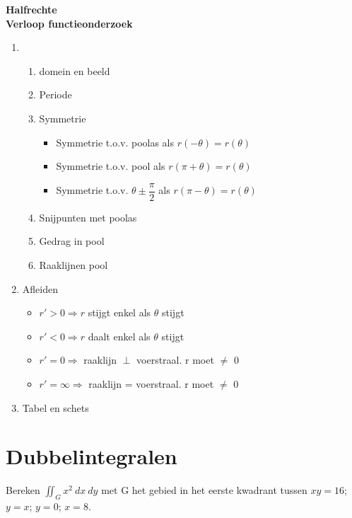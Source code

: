 \documentclass[12pt]{report}
\newcommand{\important}[1] {\textbf{\color{orange}#1}}
\begin{document}
\important{Halfrechte}
\\
\important{Verloop functieonderzoek}
\begin{enumerate}
 \item \begin{enumerate}
        \item domein en beeld
        \item Periode
        \item Symmetrie
        \begin{itemize}
         \item Symmetrie t.o.v. poolas als $r(-\theta) = r(\theta)$
         \item Symmetrie t.o.v. pool als $r(\pi + \theta) = r(\theta)$
         \item Symmetrie t.o.v. $\theta \pm \dfrac{\pi}{2}$ als $r(\pi - \theta) = r(\theta)$
        \end{itemize}

        \item Snijpunten met poolas
        \item Gedrag in pool
        \item Raaklijnen pool
       \end{enumerate}
 \item Afleiden
 \begin{itemize}
  \item $r' > 0 \Rightarrow r $ stijgt enkel als $\theta$ stijgt
  \item $r' < 0 \Rightarrow r $ daalt enkel als $\theta$ stijgt
  \item $r' = 0 \Rightarrow $ raaklijn $\perp$ voerstraal. r moet $\neq$ 0 
  \item $r' = \infty \Rightarrow $ raaklijn = voerstraal. r moet $\neq$ 0
 \end{itemize}

 \item Tabel en schets

\end{enumerate}


\chapter{Dubbelintegralen}

\hline
Bereken $\iint_G x^{2}\:dx\:dy$ met G het gebied in het eerste kwadrant tussen $xy=16$; $y=x$; 
$y = 0$; $x = 8$.



  
\end{document}
